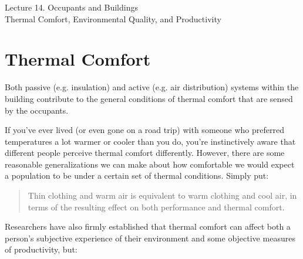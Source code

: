 \documentclass[10pt]{article}
\begin{document}
   \noindent
   \begin{center}

   \hrulefill
   
   \vspace{5pt}
   
   \vspace{0pt}
   
   {\Large \hfill  Lecture 14. Occupants and Buildings\\ \hfill {\large Thermal Comfort, Environmental Quality, and Productivity}}
   \vspace{5pt}
   
  
   \hrulefill
   \end{center}

{}

\section{Thermal Comfort}

Both passive (e.g. insulation) and active (e.g. air distribution) systems within the building contribute to the general conditions of thermal comfort that are sensed by the occupants.

If you've ever lived (or even gone on a road trip) with someone who preferred temperatures a lot warmer or cooler than you do, you're instinctively aware that different people perceive thermal comfort differently. However, there are some reasonable generalizations we can make about how comfortable we would expect a population to be under a certain set of thermal conditions. Simply put:

\begin{quote}
    Thin clothing and warm air is equivalent to warm clothing and cool air, in terms of the resulting effect on both performance and thermal comfort. \cite{Wargocki2017-ny}
\end{quote}

Researchers have also firmly established that thermal comfort can affect both a person's subjective experience of their environment and some objective measures of productivity, but:
\end{document}
